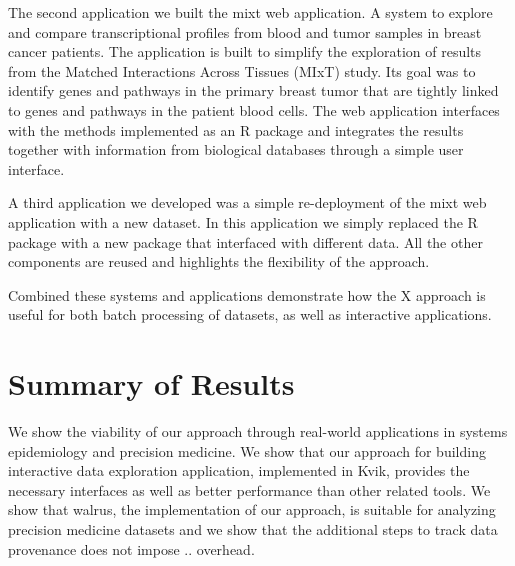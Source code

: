 The second application we built the \gls{mixt} web application. A system to
explore and compare transcriptional profiles from blood and tumor samples in
breast cancer patients. The application is built to simplify the exploration of
results from the Matched Interactions Across Tissues (MIxT) study. Its goal was
to identify genes and pathways in the primary breast tumor that are tightly
linked to genes and pathways in the patient blood
cells.\cite{dumeaux2017interactions} The web application interfaces with the
methods implemented as an R package and integrates the results together with
information from biological databases through a simple user interface. 

A third application we developed was a simple re-deployment of the \gls{mixt}
web application with a new dataset. In this application we simply replaced the R
package with a new package that interfaced with different data. All the other
components are reused and highlights the flexibility of the approach. 

Combined these systems and applications demonstrate how the X approach is useful
for both batch processing of datasets, as well as interactive applications. 



\section{Summary of Results} 

We show the viability of our approach through real-world applications in systems
epidemiology and precision medicine. We show that our approach for building
interactive data exploration application, implemented in Kvik, provides the
necessary interfaces as well as better performance than other related tools. 
We
show that walrus, the implementation of our approach, is suitable for analyzing
precision medicine datasets and we show that the additional steps to track data
provenance does not impose .. overhead. 

